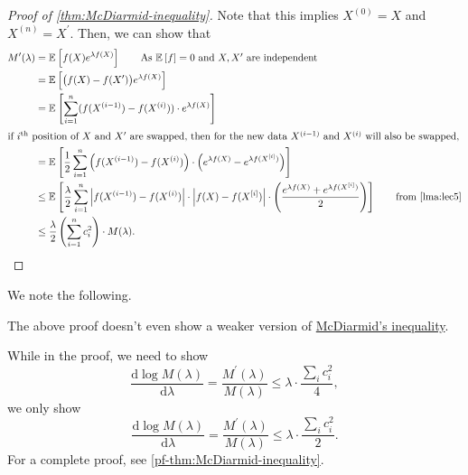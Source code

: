 \begin{proof}[Proof of \autoref{thm:McDiarmid-inequality}]
	Note that this implies \(X^{(0)} = X\) and \(X^{(n)} = X^{\prime} \). Then, we can show that
	\begin{align*}
		M^{\prime} (\lambda )
		 & = \mathbb{E}_{}\left[f(X) e^{\lambda f(X)} \right] \tag*{As \(\mathbb{E}_{}\left[f \right] = 0\) and \(X, X^{\prime} \) are independent}                                                                                                                                   \\
		 & = \mathbb{E}_{}\left[\big(f(X) - f(X^{\prime} )\big) e^{\lambda f(X)}\right]                                                                                                                                                                                               \\
		 & = \mathbb{E}_{}\left[ \sum_{i=1}^{n} (f(X^{(i-1)}) - f(X^{(i)})) \cdot e^{\lambda f(X)}\right]                                                                                                                                                                             \\
		\intertext{if \(i^{\text{th} }\) position of \(X\) and \(X^{\prime} \) are swapped, then for the new data \(X^{(i-1)}\) and \(X^{(i)}\) will also be swapped,}
		 & = \mathbb{E}_{}\left[\frac{1}{2} \sum_{i=1}^{n} \left( f(X^{(i-1)}) - f(X^{(i)}) \right) \cdot \left( e^{\lambda f(X)} - e^{\lambda f(X^{[i]})} \right)  \right]                                                                                                           \\
		 & \leq \mathbb{E}_{}\left[\frac{\lambda }{2} \sum_{i=1}^{n} \left\vert f(X^{(i-1)}) - f(X^{(i)}) \right\vert \cdot \left\vert f(X) - f(X^{[i]}) \right\vert \cdot \left( \frac{e^{\lambda f(X)} + e^{\lambda f(X^{[i]})}}{2} \right)  \right] \tag*{from \autoref{lma:lec5}} \\
		 & \leq \frac{\lambda}{2}\left( \sum_{i=1}^{n} c_i^2 \right) \cdot M(\lambda ).
	\end{align*}
\end{proof}

We note the following.

\begin{note}
	The above proof doesn't even show a weaker version of \hyperref[thm:McDiarmid-inequality]{McDiarmid's inequality}.
\end{note}
\begin{explanation}
	While in the proof, we need to show
	\[
		\frac{\mathrm{d}\log M(\lambda )}{\mathrm{d}\lambda } = \frac{M^{\prime} (\lambda )}{M(\lambda )} \leq \lambda \cdot \frac{\sum_{i} c_i^2}{4},
	\]
	we only show
	\[
		\frac{\mathrm{d}\log M(\lambda )}{\mathrm{d}\lambda } = \frac{M^{\prime} (\lambda )}{M(\lambda )} \leq \lambda \cdot \frac{\sum_{i} c_i^2}{2}.
	\]
	For a complete proof, see \autoref{pf-thm:McDiarmid-inequality}.
\end{explanation}

